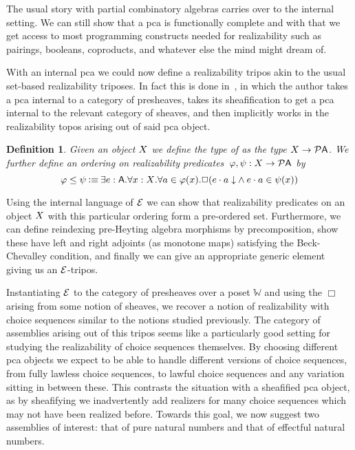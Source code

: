 \documentclass{easychair}
\newtheorem{defn}[thrm]{Definition}
\begin{document}
The usual story with partial combinatory algebras carries over to the
internal setting.
%
We can still show that a pca is functionally complete and with that we get
access to most programming constructs needed for realizability such as pairings,
booleans, coproducts, and whatever else the mind might dream of.

With an internal pca we could now define a realizability tripos akin to the
usual set-based realizability triposes.
%
In fact this is done in~\cite{vanoostenSemanticalProofJonghs1991}, in which the
author takes a pca internal to a category of presheaves, takes its
sheafification to get a pca internal to the relevant category of sheaves, and
then implicitly works in the realizability topos arising out of said pca object.
%


\begin{defn}
  Given an object \(X\) we define the type of  as the type \({{X}\to{\mathcal{P}{\ensuremath{\mathsf{A}}}}}\).
  We further define an ordering on realizability
  predicates~\(\varphi, \psi : {{X}\to{\mathcal{P}{\ensuremath{\mathsf{A}}}}}\) by
  \[
    \varphi \leq \psi
    \IsDefined
    \IExists{e : \A}{
      \IForall{x : \X}{
        \IForall{a \in \varphi(x)}{
          \IBox{(
            \IAnd%
            {\ITotal{\IAp{e}{a}}}%
            {\IAp{e}{a} \in \psi(x)}
          )}
        }
      }
    }
  \]
\end{defn}

Using the internal language of \(\mathcal{E}\) we can show that realizability predicates
on an object \(X\) with this particular ordering form a pre-ordered set.
%
Furthermore, we can define reindexing pre-Heyting algebra morphisms by
precomposition, show these have left and right adjoints (as monotone maps)
satisfying the Beck-Chevalley condition, and finally we can give an appropriate
generic element giving us an \(\mathcal{E}\)-tripos.

Instantiating \(\mathcal{E}\) to the category of presheaves over a poset \(\mathbb{W}\)
and using the \(\Box\) arising from some notion of sheaves, we recover a notion
of realizability with choice sequences similar to the notions studied
previously.
%
The category of assemblies arising out of this tripos seems like a particularly
good setting for studying the realizability of choice sequences themselves.
%
By choosing different pca objects we expect to be able to handle different
versions of choice sequences, from fully lawless choice sequences, to lawful
choice sequences and any variation sitting in between these.
%
This contrasts the situation with a sheafified pca object, as by sheafifying
we inadvertently add realizers for many choice sequences which may not
have been realized before.
%
Towards this goal, we now suggest two assemblies of interest: that of
pure natural numbers and that of effectful natural numbers.
\end{document}
